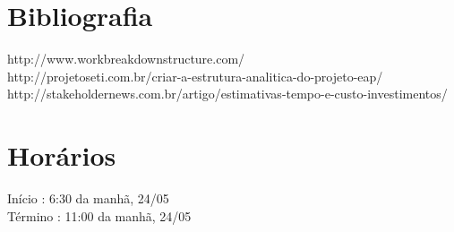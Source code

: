 \documentclass[12pt,a4paper,final]{report}
\begin{document}
\newpage
\section*{Bibliografia}
http://www.workbreakdownstructure.com/\\
http://projetoseti.com.br/criar-a-estrutura-analitica-do-projeto-eap/\\
http://stakeholdernews.com.br/artigo/estimativas-tempo-e-custo-investimentos/

\section*{Horários}
Início : 6:30 da manhã, 24/05\\
Término : 11:00 da manhã, 24/05
\end{document}
